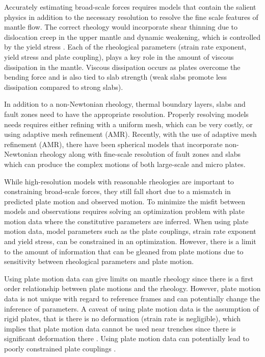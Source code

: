 \documentclass[12pt]{article}
\begin{document}
Accurately estimating broad-scale forces requires models that contain the salient physics in addition to the necessary resolution to resolve the fine scale features of mantle flow. The correct rheology would incorporate shear thinning due to dislocation creep in the upper mantle \citep{karato1993rheology} and dynamic weakening, which is controlled by the yield stress \citep{Stadler27082010, JGRB17312,GRL27564, GGGE1076,GRL20134}. Each of the rheological parameters (strain rate exponent, yield stress and plate coupling), plays a key role in the amount of viscous dissipation in the mantle. Viscous dissipation occurs as plates overcome the bending force and is also tied to slab strength (weak slabs promote less dissipation compared to strong slabs).

In addition to a non-Newtonian rheology, thermal boundary layers, slabs and fault zones need to have the appropriate resolution. Properly resolving models needs requires either refining with a uniform mesh, which can be very costly, or using adaptive mesh refinement (AMR). Recently, with the use of adaptive mesh refinement (AMR), there have been spherical models that incorporate non-Newtonian rheology along with fine-scale resolution of fault zones and slabs \citep{Stadler27082010,JGRB17312} which can produce the complex motions of both large-scale and micro plates. 

While high-resolution models with reasonable rheologies are important to constraining broad-scale forces, they still fall short due to a mismatch in predicted plate motion and observed motion. To minimize the misfit between models and observations requires solving an optimization problem with plate motion data \citep{ratnaswamy2015adjoint} where the constitutive parameters are inferred. When using plate motion data, model parameters such as the plate couplings, strain rate exponent and yield stress, can be constrained in an optimization. However, there is a limit to the amount of information that can be gleaned from plate motions \citep{ratnaswamy2015adjoint} due to sensitivity between rheological parameters and plate motion. 

Using plate motion data can give limits on mantle rheology since there is a first order relationship between plate motions and the rheology. However, plate motion data is not unique with regard to reference frames \citep{GRL4869,GGGE2060} and can potentially change the inference of parameters.  A caveat of using plate motion data is the assumption of rigid plates, that is there is no deformation (strain rate is negligible), which implies that plate motion data cannot be used near trenches since there is significant deformation there \citep{kreemer2003integrated}. Using plate motion data can potentially lead to  poorly constrained plate couplings \citep{ratnaswamy2015adjoint}.
\end{document}
